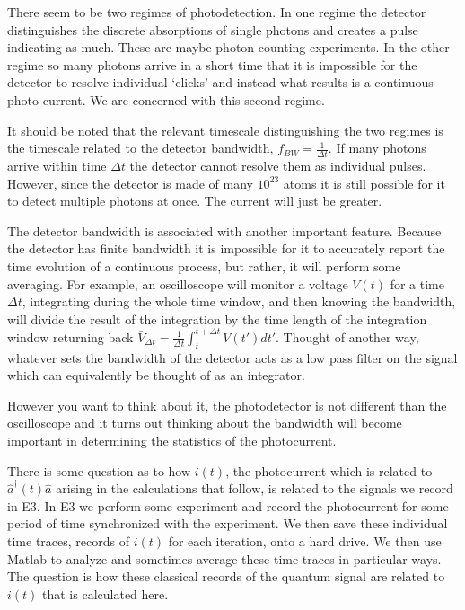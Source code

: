 \documentclass[12pt]{article}
\begin{document}
There seem to be two regimes of photodetection. In one regime the detector distinguishes the discrete absorptions of single photons and creates a pulse indicating as much. These are maybe photon counting experiments. In the other regime so many photons arrive in a short time that it is impossible for the detector to resolve individual `clicks' and instead what results is a continuous photo-current. We are concerned with this second regime.

It should be noted that the relevant timescale distinguishing the two regimes is the timescale related to the detector bandwidth, $f_{BW} = \frac{1}{\Delta t}$. If many photons arrive within time $\Delta t$ the detector cannot resolve them as individual pulses. However, since the detector is made of many $10^{23}$ atoms it is still possible for it to detect multiple photons at once. The current will just be greater.

The detector bandwidth is associated with another important feature. Because the detector has finite bandwidth it is impossible for it to accurately report the time evolution of a continuous process, but rather, it will perform some averaging. For example, an oscilloscope will monitor a voltage $V(t)$ for a time $\Delta t$, integrating during the whole time window, and then knowing the bandwidth, will divide the result of the integration by the time length of the integration window returning back $\bar{V}_{\Delta t} = \frac{1}{\Delta t}\int_t^{t+\Delta t} V(t') dt'$. Thought of another way, whatever sets the bandwidth of the detector acts as a low pass filter on the signal which can equivalently be thought of as an integrator.

However you want to think about it, the photodetector is not different than the oscilloscope and it turns out thinking about the bandwidth will become important in determining the statistics of the photocurrent.

There is some question as to how $i(t)$, the photocurrent which is related to $\hat{a}^{\dag}(t)\hat{a}$ arising in the calculations that follow, is related to the signals we record in E3. In E3 we perform some experiment and record the photocurrent for some period of time synchronized with the experiment. We then save these individual time traces, records of $i(t)$ for each iteration, onto a hard drive. We then use Matlab to analyze and sometimes average these time traces in particular ways. The question is how these classical records of the quantum signal are related to $i(t)$ that is calculated here.
\end{document}
